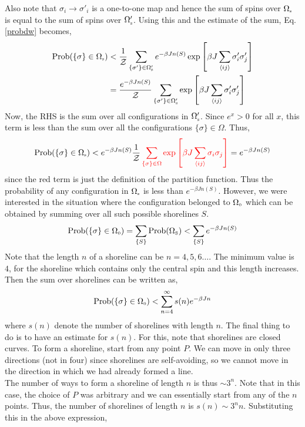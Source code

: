 Also note that $\sigma_i\to \sigma'_i$ is a one-to-one map and hence the sum of spins over $\Omega_{\text{\tiny s}}$ is equal to the sum of spins over $\Omega'_{\text{\tiny s}}$. Using this and the estimate of the sum, Eq. \eqref{probdw} becomes, 
\begin{align}
    \begin{split}
        \mathrm{Prob}(\{\sigma\}\in \Omega_{\text{\tiny s}}) &< \frac{1}{\mathcal Z}\sum\limits_{\{\sigma'\}\in\Omega'_{\text{\tiny s}}} e^{-\beta J n(S)} \exp\qty[\beta J \sum\limits_{\left\langle ij \right\rangle}\sigma_i'\sigma_j']\\
        &=\frac{e^{-\beta J n(S)}}{\mathcal Z}\sum\limits_{\{\sigma'\}\in\Omega'_{\text{\tiny s}}}  \exp\qty[\beta J \sum\limits_{\left\langle ij \right\rangle}\sigma_i'\sigma_j']
    \end{split}
\end{align}
Now, the RHS is the sum over all configurations in $\Omega'_{\text{\tiny s}}$. Since $e^x>0$ for all $x$, this term is less than the sum over all the configurations $\{\sigma\}\in \Omega$. Thus,
$$ \mathrm{Prob}(\{\sigma\}\in \Omega\tund{s}) < e^{-\beta J n(S)}\frac{1}{\SZ} \mathcolor{red}{\sum\limits_{\{\sigma\}\in \Omega} \exp\qty[\beta J \sum\limits_{\avg{ij}}\sigma_i\sigma_j]} = e^{-\beta J n(S)}$$
since the red term is just the definition of the partition function. Thus the probability of any configuration in $\Omega_{\text{\tiny s}}$ is less than $e^{-\beta Jn(S)}$. However, we were interested in the situation where the configuration belonged to $\Omega_{\text{\tiny 0}}$ which can be obtained by summing over all such possible shorelines $S$. 
\begin{align*}
    \mathrm{Prob}(\{\sigma\} \in \Omega_{\text{\tiny 0}}) =\sum\limits_{\{S \}}\mathrm{Prob}(\Omega_{\text{\tiny S}})< \sum\limits_{\{S\}} e^{-\beta J n(S)}
\end{align*}
Note that the length $n$ of a shoreline can be $n=4,5,6\ldots$. The minimum value is $4$, for the shoreline which contains only the central spin and this length increases. Then the sum over shorelines can be written as, 
$$\mathrm{Prob}(\{\sigma\} \in \Omega_{\text{\tiny 0}}) <\sum\limits_{n=4}^\infty s(n) e^{-\beta J n}$$
where $s(n)$ denote the number of shorelines with length $n$. The final thing to do is to have an estimate for $s(n)$. For this, note that shorelines are closed curves. To form a shoreline, start from any point $P$. We can move in only three directions (not in four) since shorelines are self-avoiding, so we cannot move in the direction in which we had already formed a line.\\[0.2cm] The number of ways to form a shoreline of length $n$ is thus $\sim 3^n$. Note that in this case, the choice of $P$ was arbitrary and we can essentially start from any of the $n$ points. Thus, the number of shorelines of length $n$ is $s(n)\sim 3^n n$. Substituting this in the above expression, 
